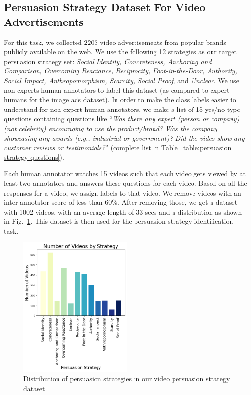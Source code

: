 \documentclass[hidelinks,11pt,a4paper]{report}
\begin{document}
\subsection{Persuasion Strategy Dataset For Video Advertisements}
For this task, we collected 2203 video advertisements from popular brands publicly available on the web. We use the following 12 strategies as our target persuasion strategy set: \textit{Social Identity, Concreteness, Anchoring and Comparison, Overcoming Reactance, Reciprocity, Foot-in-the-Door, Authority, Social Impact, Anthropomorphism, Scarcity, Social Proof,} and \textit{Unclear}. We use non-experts human annotators to label this dataset (as compared to expert humans for the image ads dataset). In order to make the class labels easier to understand for non-expert human annotators, we make a list of 15 yes/no type-questions containing questions like ``\textit{Was there any expert (person or company) (not celebrity) encouraging to use the product/brand? Was the company showcasing any awards (e.g., industrial or government)? Did the video show any customer reviews or testimonials?}'' (complete list in Table~\ref{table:persuasion strategy questions}). 

Each human annotator watches 15 videos such that each video gets viewed by at least two annotators and answers these questions for each video. Based on all the responses for a video, we assign labels to that video. We remove videos with an inter-annotator score of less than 60\%. After removing those, we get a dataset with 1002 videos, with an average length of 33 secs and a distribution as shown in Fig.~\ref{fig:persuasion-strategy-dataset-distribution}. This dataset is then used for the persuasion strategy identification task. 


\begin{figure}[!h]
    \centering
    \includegraphics[width=0.5\textwidth]{images/video_strategies.png}
    \caption{Distribution of persuasion strategies in our video persuasion strategy dataset}
    \label{fig:persuasion-strategy-dataset-distribution}
\end{figure}
\end{document}
